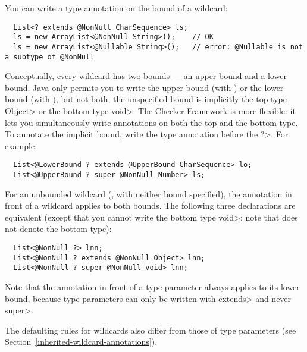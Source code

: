 You can write a type annotation on the bound of a wildcard:

\begin{Verbatim}
  List<? extends @NonNull CharSequence> ls;
  ls = new ArrayList<@NonNull String>();    // OK
  ls = new ArrayList<@Nullable String>();   // error: @Nullable is not a subtype of @NonNull
\end{Verbatim}

Conceptually, every wildcard has two bounds --- an upper bound and a lower
bound.  Java only permits you to write the upper bound (with
) or the lower bound (with ), but not both; the unspecified bound is implicitly the
top type
\<Object> or the bottom type \<void>.  The Checker Framework is more
flexible:  it lets you simultaneously write annotations on both the top and
the bottom type.  To annotate the implicit bound, write the type annotation
before the \<?>.  For example:

\begin{Verbatim}
  List<@LowerBound ? extends @UpperBound CharSequence> lo;
  List<@UpperBound ? super @NonNull Number> ls;
\end{Verbatim}

For an unbounded wildcard (, with neither
bound specified), the annotation in front of a wildcard applies
to both bounds.  The following three declarations are equivalent (except
that you cannot write the bottom type \<void>; note that
 does not denote the bottom type):

\begin{Verbatim}
  List<@NonNull ?> lnn;
  List<@NonNull ? extends @NonNull Object> lnn;
  List<@NonNull ? super @NonNull void> lnn;
\end{Verbatim}

\noindent
Note that the annotation in front of a type parameter always applies to its
lower bound, because type parameters can only be written with \<extends>
and never \<super>.



The defaulting rules for
wildcards also differ from those of type parameters (see
Section~\ref{inherited-wildcard-annotations}).


